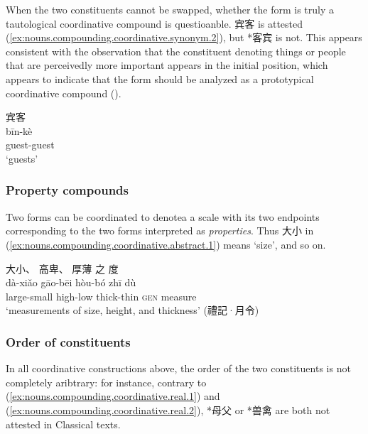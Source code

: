 \documentclass[UTF8, a4paper, oneside, scheme=plain, 12pt]{ctexrep}
\newcommand{\translate}[1]{`#1'}
\newcommand*{\category}[1]{\textsc{#1}}
\begin{document}
When the two constituents cannot be swapped, whether the form is truly a tautological coordinative compound is questioanble.
宾客 is attested (\ref{ex:nouns.compounding.coordinative.synonym.2}), but *客宾 is not. 
This appears consistent with the observation that the constituent denoting things or people that are perceivedly more important appears in the initial position,
which appears to indicate that the form should be analyzed as a prototypical coordinative compound ().

\begin{exe}
    \ex\label{ex:nouns.compounding.coordinative.synonym.2}
    \glll 宾客 \\
    bīn-kè \\
    guest-guest \\
    \glt\translate{guests}
\end{exe}

\subsubsection{Property compounds}

Two forms can be coordinated to denotea a scale with its two endpoints corresponding to the two forms interpreted as \emph{properties}.
Thus 大小 in (\ref{ex:nouns.compounding.coordinative.abstract.1}) means \translate{size}, and so on.

\begin{exe}
    \ex\label{ex:nouns.compounding.coordinative.abstract.1}
    \glll
    大小、 高卑、 厚薄 之 度 \\
    dà-xiǎo gāo-bēi hòu-bó zhī dù \\
    large-small high-low thick-thin \category{gen} measure \\
    \glt\translate{measurements of size, height, and thickness} \hfill (禮記·月令)
\end{exe}

\subsubsection{Order of constituents}

In all coordinative constructions above, 
the order of the two constituents is not completely aribtrary:
for instance, contrary to (\ref{ex:nouns.compounding.coordinative.real.1}) and (\ref{ex:nouns.compounding.coordinative.real.2}),
*母父 or *兽禽 are both not attested in Classical texts.
\end{document}
